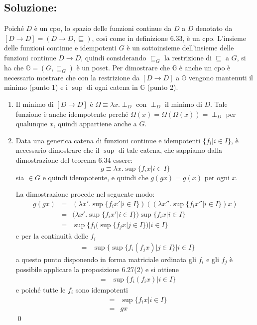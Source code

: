 \documentclass[a4paper,twosides]{report}
\begin{document}
\subsection*{Soluzione:}
Poich\'e $D$ \`e un cpo, lo spazio delle funzioni continue da $D$ a
$D$ denotato da $[D\rightarrow D] = (D\rightarrow D, \sqsubseteq)$,
cos\`i come in definizione 6.33, \`e un cpo. L'insieme delle funzioni
continue e idempotenti $G$ \`e un sottoinsieme dell'insieme delle funzioni
continue $D\rightarrow D$, quindi considerando $\sqsubseteq_G$ la
restrizione di $\sqsubseteq$ a $G$, si ha che $\mathbb{G} = (G,\sqsubseteq_G)$ \`e
un poset. Per dimostrare che $\mathbb{G}$ \`e anche un cpo \`e
necessario mostrare che con la restrizione da $[D\rightarrow D]$ a
$\mathbb{G}$ vengono mantenuti il minimo (punto 1) e i $\sup$ di ogni
catena in $\mathbb{G}$ (punto 2).
\begin{enumerate}
\item Il minimo di $[D\rightarrow D]$ \`e $\Omega\equiv\lambda
  x.\perp_D$ con $\perp_D$ il minimo di $D$. Tale funzione \`e anche
  idempotente perch\'e $\Omega(x)=\Omega(\Omega(x))=\perp_D$ per
  qualunque $x$, quindi appartiene anche a $G$.
\item Data una generica catena di funzioni continue e idempotenti
  $\{f_i|i\in I\}$, \`e necessario dimostrare che il $\sup$ di tale
  catena, che sappiamo dalla dimostrazione del teorema 6.34 essere:
  $$g\equiv\lambda x.\sup\{ f_i x|i\in I\}$$
  sia $\in G$ e quindi idempotente, e quindi che $g(g x)=g(x)$ per
  ogni $x$.

  La dimostrazione procede nel seguente modo:
  \begin{eqnarray*}
    g(g x)&=&(\lambda x'.\sup\{f_i x'|i\in I\})((\lambda x''.\sup\{f_i x''|i\in I\})x)\\
    &=&(\lambda x'.\sup\{f_i x'|i\in I\})\sup\{f_i x|i\in I\}\\
    &=&\sup\{f_i (\sup\{f_j x|j\in I\})|i\in I\}
  \end{eqnarray*}
  e per la continuit\`a delle $f_i$
  \begin{eqnarray*}
    &=&\sup\{\sup\{f_i (f_j x)|j\in I\}|i\in I\}
  \end{eqnarray*}
  a questo punto disponendo in forma matriciale ordinata gli $f_i$ e
  gli $f_j$ \`e possibile applicare la proposizione 6.27(2) e si
  ottiene
  \begin{eqnarray*}
    &=&\sup\{f_i(f_i x)|i\in I\}
  \end{eqnarray*}
  e poich\'e tutte le $f_i$ sono idempotenti
  \begin{eqnarray*}
    &=&\sup\{f_i x|i\in I\}\\
    &=&g x
  \end{eqnarray*}
  \qed
\end{enumerate}
\end{document}
